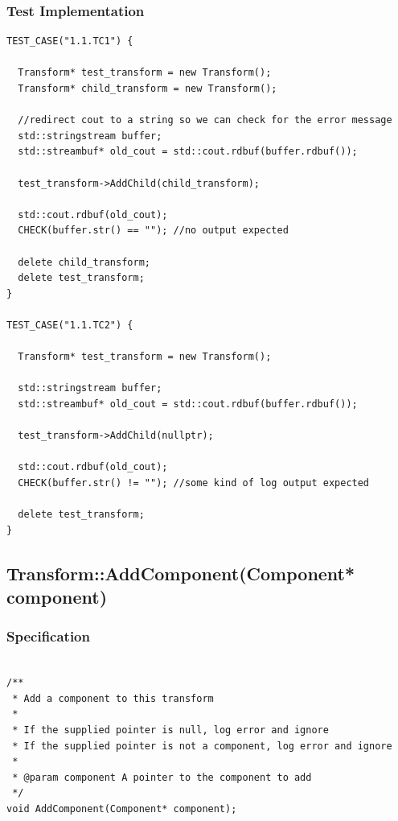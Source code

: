 \documentclass[11pt]{article}
\begin{document}
\subsubsection*{Test Implementation}
\label{sec:org8113c33}
\begin{verbatim}
TEST_CASE("1.1.TC1") {

  Transform* test_transform = new Transform();
  Transform* child_transform = new Transform();

  //redirect cout to a string so we can check for the error message
  std::stringstream buffer;
  std::streambuf* old_cout = std::cout.rdbuf(buffer.rdbuf());

  test_transform->AddChild(child_transform);

  std::cout.rdbuf(old_cout);
  CHECK(buffer.str() == ""); //no output expected

  delete child_transform;
  delete test_transform;
}

TEST_CASE("1.1.TC2") {

  Transform* test_transform = new Transform();

  std::stringstream buffer;
  std::streambuf* old_cout = std::cout.rdbuf(buffer.rdbuf());

  test_transform->AddChild(nullptr);

  std::cout.rdbuf(old_cout);
  CHECK(buffer.str() != ""); //some kind of log output expected    

  delete test_transform;
}

\end{verbatim}
\subsection{Transform::AddComponent(Component* component)}
\label{sec:orga144f2b}
\subsubsection*{Specification}
\label{sec:org1a52272}
\begin{verbatim}

/**
 * Add a component to this transform
 *
 * If the supplied pointer is null, log error and ignore
 * If the supplied pointer is not a component, log error and ignore
 *
 * @param component A pointer to the component to add
 */  
void AddComponent(Component* component);
\end{verbatim}
\end{document}
